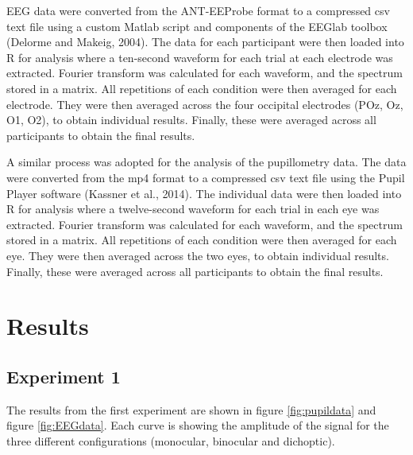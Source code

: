 \documentclass[
]{article}
\begin{document}
EEG data were converted from the ANT-EEProbe format to a compressed csv text file using a custom Matlab script and components of the EEGlab toolbox (Delorme and Makeig, 2004). The data for each participant were then loaded into R for analysis where a ten-second waveform for each trial at each electrode was extracted. Fourier transform was calculated for each waveform, and the spectrum stored in a matrix. All repetitions of each condition were then averaged for each electrode. They were then averaged across the four occipital electrodes (POz, Oz, O1, O2), to obtain individual results. Finally, these were averaged across all participants to obtain the final results.

A similar process was adopted for the analysis of the pupillometry data. The data were converted from the mp4 format to a compressed csv text file using the Pupil Player software (Kassner et al., 2014). The individual data were then loaded into R for analysis where a twelve-second waveform for each trial in each eye was extracted. Fourier transform was calculated for each waveform, and the spectrum stored in a matrix. All repetitions of each condition were then averaged for each eye. They were then averaged across the two eyes, to obtain individual results. Finally, these were averaged across all participants to obtain the final results.

\hypertarget{results}{%
\section{Results}\label{results}}

\hypertarget{experiment-1-1}{%
\subsection{Experiment 1}\label{experiment-1-1}}

The results from the first experiment are shown in figure \ref{fig:pupildata} and figure \ref{fig:EEGdata}. Each curve is showing the amplitude of the signal for the three different configurations (monocular, binocular and dichoptic).
\end{document}
